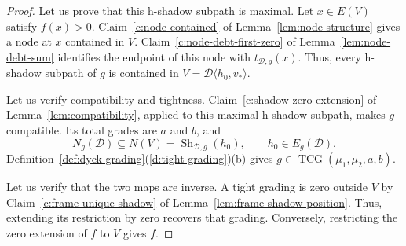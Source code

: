 \begin{proof}
Let us prove that this h-shadow subpath is maximal.
Let $x\in E(V)$ satisfy $f(x)>0$.
Claim~\ref{c:node-contained} of Lemma~\ref{lem:node-structure} gives a node at $x$ contained in $V$.
Claim~\ref{c:node-debt-first-zero} of Lemma~\ref{lem:node-debt-sum} identifies the endpoint of this node with $t_{\mathcal D,g}(x)$.
Thus, every h-shadow subpath of $g$ is contained in $V=\mathcal D\langle h_0,v_*\rangle$.

Let us verify compatibility and tightness.
Claim~\ref{c:shadow-zero-extension} of Lemma~\ref{lem:compatibility}, applied to this maximal h-shadow subpath, makes $g$ compatible.
Its total grades are $a$ and $b$, and
\[
 N_g(\mathcal D)\subseteq N(V)
 =\operatorname{Sh}_{\mathcal D,g}(h_0),\qquad
 h_0\in E_g(\mathcal D).
\]
Definition~\ref{def:dyck-grading}(\ref{d:tight-grading})(b) gives
$g\in\operatorname{TCG}(\mu_1,\mu_2,a,b)$.

Let us verify that the two maps are inverse.
A tight grading is zero outside $V$ by Claim~\ref{c:frame-unique-shadow} of Lemma~\ref{lem:frame-shadow-position}.
Thus, extending its restriction by zero recovers that grading.
Conversely, restricting the zero extension of $f$ to $V$ gives $f$.
\end{proof}

